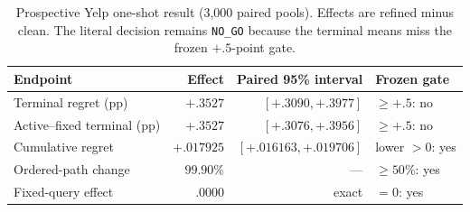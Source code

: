 \begin{table}[H]
\centering
\caption{Prospective Yelp one-shot result (3,000 paired pools). Effects are refined minus clean. The literal decision remains \texttt{NO\_GO} because the terminal means miss the frozen $+.5$-point gate.}
\label{tab:step105-yelp}
\scriptsize
\setlength{\tabcolsep}{4pt}
\begin{tabular}{@{}lrrl@{}}
\toprule
Endpoint & Effect & Paired 95\% interval & Frozen gate \\
\midrule
Terminal regret (pp) & $+.3527$ & $[+.3090,+.3977]$ & $\geq+.5$: no \\
Active--fixed terminal (pp) & $+.3527$ & $[+.3076,+.3956]$ & $\geq+.5$: no \\
Cumulative regret & $+.017925$ & $[+.016163,+.019706]$ & lower $>0$: yes \\
Ordered-path change & $99.90\%$ & --- & $\geq50\%$: yes \\
Fixed-query effect & $.0000$ & exact & $=0$: yes \\
\bottomrule
\end{tabular}
\end{table}
